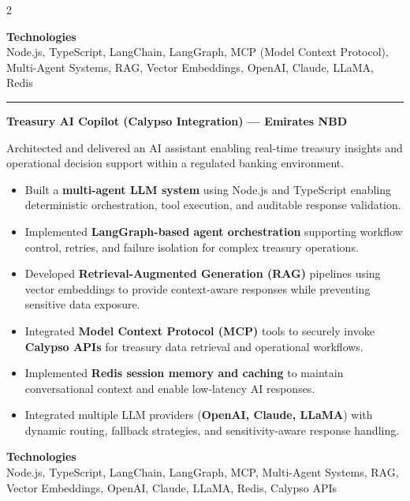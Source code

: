 \documentclass[10pt,a4paper]{article}
\newcommand{\blockdivider}{\vspace{0pt}\color{rulecolor}\rule{\linewidth}{0.5pt}\color{primary}\vspace{4pt}}
\newcommand{\projecttitle}[1]{\textbf{#1}\par\vspace{2pt}}
\begin{document}
\begin{paracol}{2}
\begin{itemize}
\end{itemize}

\textbf{Technologies}\\
Node.js, TypeScript, LangChain, LangGraph, MCP (Model Context Protocol), Multi-Agent Systems, RAG, Vector Embeddings, OpenAI, Claude, LLaMA, Redis

\blockdivider

\projecttitle{Treasury AI Copilot (Calypso Integration) — Emirates NBD}

Architected and delivered an AI assistant enabling real-time treasury insights and operational decision support within a regulated banking environment.

\begin{itemize}

\item Built a \textbf{multi-agent LLM system} using Node.js and TypeScript enabling deterministic orchestration, tool execution, and auditable response validation.

\item Implemented \textbf{LangGraph-based agent orchestration} supporting workflow control, retries, and failure isolation for complex treasury operations.

\item Developed \textbf{Retrieval-Augmented Generation (RAG)} pipelines using vector embeddings to provide context-aware responses while preventing sensitive data exposure.

\item Integrated \textbf{Model Context Protocol (MCP)} tools to securely invoke \textbf{Calypso APIs} for treasury data retrieval and operational workflows.

\item Implemented \textbf{Redis session memory and caching} to maintain conversational context and enable low-latency AI responses.

\item Integrated multiple LLM providers (\textbf{OpenAI, Claude, LLaMA}) with dynamic routing, fallback strategies, and sensitivity-aware response handling.

\end{itemize}

\textbf{Technologies}\\
Node.js, TypeScript, LangChain, LangGraph, MCP, Multi-Agent Systems, RAG, Vector Embeddings, OpenAI, Claude, LLaMA, Redis, Calypso APIs

\vspace{42pt}


\end{paracol}
\end{document}
